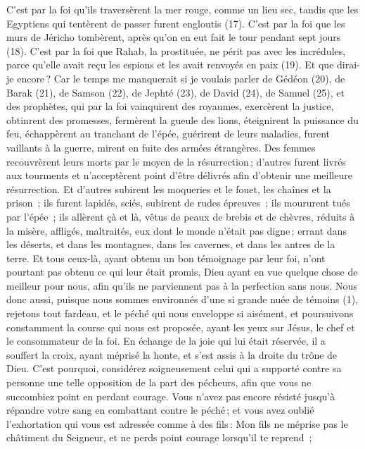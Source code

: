 \begin{multicols}{2}
C’est par la foi qu’ils traversèrent la mer rouge, comme un lieu sec, tandis que les Egyptiens qui tentèrent de passer furent engloutis (17).
C’est par la foi que les murs de Jéricho tombèrent, après qu'on en eut fait le tour pendant sept jours (18).
C’est par la foi que Rahab, la prostituée, ne périt pas avec les incrédules, parce qu’elle avait reçu les espions et les avait renvoyés en paix (19).
Et que dirai-je encore ? Car le temps me manquerait si je voulais parler de Gédéon (20), de Barak (21), de Samson (22), de Jephté (23), de David (24), de Samuel (25), et des prophètes,
qui par la foi vainquirent des royaumes, exercèrent la justice, obtinrent des promesses, fermèrent la gueule des lions,
éteignirent la puissance du feu, échappèrent au tranchant de l’épée, guérirent de leurs maladies, furent vaillants à la guerre, mirent en fuite des armées étrangères.
Des femmes recouvrèrent leurs morts par le moyen de la résurrection ; d'autres furent livrés aux tourments et n’acceptèrent point d'être délivrés afin d'obtenir une meilleure résurrection.
Et d'autres subirent les moqueries et le fouet, les chaînes et la prison ;
ils furent lapidés, sciés, subirent de rudes épreuves ; ils moururent tués par l'épée ; ils allèrent çà et là, vêtus de peaux de brebis et de chèvres, réduits à la misère, affligés, maltraités,
eux dont le monde n'était pas digne ; errant dans les déserts, et dans les montagnes, dans les cavernes, et dans les antres de la terre.
Et tous ceux-là, ayant obtenu un bon témoignage par leur foi, n'ont pourtant pas obtenu ce qui leur était promis,
Dieu ayant en vue quelque chose de meilleur pour nous, afin qu'ils ne parviennent pas à la perfection sans nous.
\VerseOne{}Nous donc aussi, puisque nous sommes environnés d'une si grande nuée de témoins (1), rejetons tout fardeau, et le péché qui nous enveloppe si aisément, et poursuivons constamment la course qui nous est proposée,
ayant les yeux sur Jésus, le chef et le consommateur de la foi. En échange de la joie qui lui était réservée, il a souffert la croix, ayant méprisé la honte, et s'est assis à la droite du trône de Dieu.
C'est pourquoi, considérez soigneusement celui qui a supporté contre sa personne une telle opposition de la part des pécheurs, afin que vous ne succombiez point en perdant courage.
Vous n'avez pas encore résisté jusqu'à répandre votre sang en combattant contre le péché ;
et vous avez oublié l'exhortation qui vous est adressée comme à des fils : Mon fils ne méprise pas le châtiment du Seigneur, et ne perds point courage lorsqu’il te reprend ;

\end{multicols}
